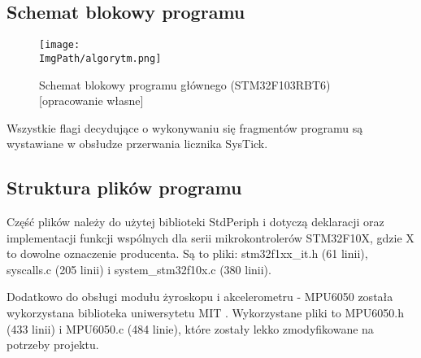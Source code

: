 \documentclass[a4paper,12pt,twoside,openany]{report}
\newcommand{\ImgPath}{.}
\begin{document}
\subsection{Schemat blokowy programu}

\begin{figure}[!htbp]
	\begin{center}
\centering
\texttt{[image: \\ImgPath/algorytm.png]}
\end{center}
	\caption{Schemat blokowy programu głównego (STM32F103RBT6) [opracowanie własne]}
	\label{schematKomunikacji}
\end{figure}

Wszystkie flagi decydujące o wykonywaniu się fragmentów programu są wystawiane w obsłudze przerwania licznika SysTick.

\subsection{Struktura plików programu}

Część plików należy do użytej biblioteki StdPeriph i dotyczą deklaracji oraz implementacji funkcji wspólnych dla serii mikrokontrolerów STM32F10X, gdzie X to dowolne oznaczenie producenta. Są to pliki: stm32f1xx\_it.h (61 linii), syscalls.c (205 linii) i system\_stm32f10x.c (380 linii). 

Dodatkowo do obsługi modułu żyroskopu i akcelerometru - MPU6050 została wykorzystana biblioteka uniwersytetu MIT \cite{harinadha}. Wykorzystane pliki to MPU6050.h (433 linii) i MPU6050.c (484 linie), które zostały lekko zmodyfikowane na potrzeby projektu.
\end{document}

